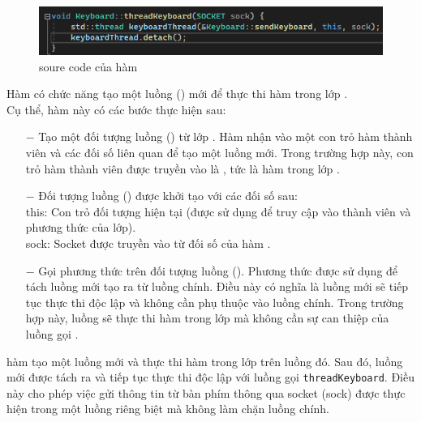 \begin{itemize}
    \begin{figure}[H]
    \begin{center}
    \includegraphics[scale=0.8]{img/threadKeyboard.png}
    \caption{soure code của hàm \textbf{}}
    \end{center}
    \end{figure}
    Hàm \textbf{} có chức năng tạo một luồng (\textbf{}) mới để thực thi hàm \textbf{} trong lớp \textbf{}.\\
    Cụ thể, hàm này có các bước thực hiện sau:
    \begin{itemize}
        \item[$-$] Tạo một đối tượng luồng (\textbf{}) từ lớp \textbf{}. Hàm \textbf{} nhận vào một con trỏ hàm thành viên và các đối số liên quan để tạo một luồng mới. Trong trường hợp này, con trỏ hàm thành viên được truyền vào là \textbf{}, tức là hàm \textbf{} trong lớp \textbf{}.
        \item[$-$]Đối tượng luồng (\textbf{}) được khởi tạo với các đối số sau:\\
        this: Con trỏ đối tượng hiện tại (được sử dụng để truy cập vào thành viên và phương thức của lớp).\\
        sock: Socket được truyền vào từ đối số của hàm \textbf{}.
        \item[$-$]Gọi phương thức \textbf{} trên đối tượng luồng (\textbf{}). Phương thức \textbf{} được sử dụng để tách luồng mới tạo ra từ luồng chính. Điều này có nghĩa là luồng mới sẽ tiếp tục thực thi độc lập và không cần phụ thuộc vào luồng chính. Trong trường hợp này, luồng \textbf{} sẽ thực thi hàm \textbf{} trong lớp \textbf{} mà không cần sự can thiệp của luồng gọi \textbf{}.
    \end{itemize}
    hàm \textbf{} tạo một luồng mới và thực thi hàm \textbf{} trong lớp \textbf{} trên luồng đó. Sau đó, luồng mới được tách ra và tiếp tục thực thi độc lập với luồng gọi \lstinline[language=C++]|threadKeyboard|. Điều này cho phép việc gửi thông tin từ bàn phím thông qua socket (sock) được thực hiện trong một luồng riêng biệt mà không làm chặn luồng chính.

\end{itemize}
